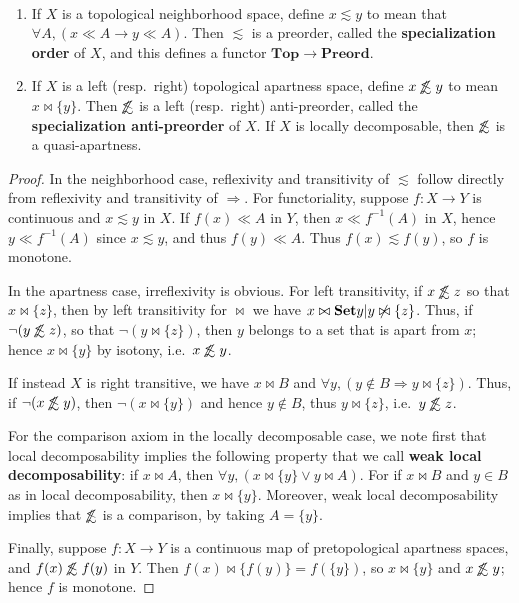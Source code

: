 \documentclass{article}
\def\oapt{\mathrel{\!\not\,\not\lesssim}}
\def\leapx{\lesssim}
\let\implies\Rightarrow
\def\inv{^{-1}}
\def\singleton#1{\{#1\}}
\def\Preord{\mathbf{Preord}}
\def\Top{\mathbf{Top}}
\begin{document}
\begin{thm}\label{thm:top-ord}\ 
  \begin{enumerate}
  \item If $X$ is a topological neighborhood space, define $x\leapx y$ to mean that $\forall A, (x\ll A \to y\ll A)$.
    Then $\leapx$ is a preorder, called the \textbf{specialization order} of $X$, and this defines a functor $\Top \to \Preord$.
  \item If $X$ is a left (resp.\ right) topological apartness space, define $x\oapt y$ to mean $x \bowtie \singleton{y}$.
    Then $\oapt$ is a left (resp.\ right) anti-preorder, called the \textbf{specialization anti-preorder} of $X$.
    If $X$ is locally decomposable, then $\oapt$ is a quasi-apartness.
  \end{enumerate}
\end{thm}
\begin{proof}
  In the neighborhood case, reflexivity and transitivity of $\leapx$ follow directly from reflexivity and transitivity of $\implies$.
  For functoriality, suppose $f:X\to Y$ is continuous and $x\leapx y$ in $X$.
  If $f(x)\ll A$ in $Y$, then $x\ll f\inv(A)$ in $X$, hence $y\ll f\inv(A)$ since $x\leapx y$, and thus $f(y)\ll A$.
  Thus $f(x)\leapx f(y)$, so $f$ is monotone.

  In the apartness case, irreflexivity is obvious.
  For left transitivity, if $x\oapt z$ so that $x\bowtie \singleton{z}$, then by left transitivity for $\bowtie$ we have $x \bowtie \setof{y|y\not \bowtie \singleton{z}}$.
  Thus, if $\neg (y\oapt z)$, so that $\neg (y\bowtie \singleton{z})$, then $y$ belongs to a set that is apart from $x$; hence $x\bowtie \singleton{y}$ by isotony, i.e.\ $x\oapt y$.

  If instead $X$ is right transitive, we have $x\bowtie B$ and $\forall y, (y\notin B \implies y\bowtie \singleton{z})$.
  Thus, if $\neg (x\oapt y)$, then $\neg (x\bowtie \singleton{y})$ and hence $y\notin B$, thus $y\bowtie\singleton{z}$, i.e.\ $y\oapt z$.

  For the comparison axiom in the locally decomposable case, we note first that local decomposability implies the following property that we call \textbf{weak local decomposability}: if $x\bowtie A$, then $\forall y, (x\bowtie \singleton{y} \lor y\bowtie A)$.
  For if $x\bowtie B$ and $y\in B$ as in local decomposability, then $x\bowtie \singleton{y}$.
  Moreover, weak local decomposability implies that $\oapt$ is a comparison, by taking $A = \singleton{y}$.

  Finally, suppose $f:X\to Y$ is a continuous map of pretopological apartness spaces, and $f(x)\oapt f(y)$ in $Y$.
  Then $f(x) \bowtie \singleton{ f(y)} = f(\singleton{y})$, so $x\bowtie \singleton{y}$ and $x\oapt y$; hence $f$ is monotone.
\end{proof}
\end{document}
